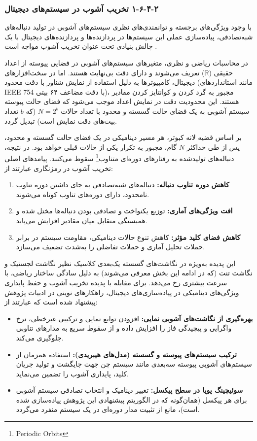 \subsubsection{‏۲‏-‏۴‏-‏۶‏-‏۱‏ تخریب آشوب در سیستم‌های دیجیتال}

با وجود ویژگی‌های برجسته و توانمندی‌های نظری سیستم‌های آشوبی در تولید دنباله‌های شبه‌تصادفی، پیاده‌سازی عملی این سیستم‌ها در پردازنده‌ها و پردازنده‌های دیجیتال با یک چالش بنیادی تحت عنوان تخریب آشوب مواجه است \cite{ref5, ref19}. 

در محاسبات ریاضی و نظری، متغیرهای سیستم‌های آشوبی در فضایی پیوسته از اعداد حقیقی ($\mathbb{R}$) تعریف می‌شوند و دارای دقت بی‌نهایت هستند. اما در سخت‌افزارهای دیجیتال، کامپیوترها به دلیل استفاده از نمایش شناور با دقت محدود (مانند استانداردهای IEEE 754 با دقت مضاعف ۶۴ بیتی)، مجبور به گرد کردن و کوانتایز کردن مقادیر هستند. این محدودیت دقت در نمایش اعداد موجب می‌شود که فضای حالت پیوسته سیستم آشوبی به یک فضای حالت گسسته و محدود با تعداد حالات $N=2^b$ (که $b$ تعداد بیت‌های دقت نمایش است) تبدیل گردد.

بر اساس قضیه لانه کبوتر، هر مسیر دینامیکی در یک فضای حالت گسسته و محدود، پس از طی حداکثر $N$ گام، مجبور به تکرار یکی از حالات قبلی خواهد بود. در نتیجه، دنباله‌های تولیدشده به رفتارهای دوره‌ای متناوب\footnote{Periodic Orbits} سقوط می‌کنند. پیامدهای اصلی تخریب آشوب در رمزنگاری عبارتند از:
\begin{enumerate}
    \item \textbf{کاهش دوره تناوب دنباله:} دنباله‌های شبه‌تصادفی به جای داشتن دوره تناوب نامحدود، دارای دوره‌های تناوب کوتاه می‌شوند.
    \item \textbf{افت ویژگی‌های آماری:} توزیع یکنواخت و تصادفی بودن دنباله‌ها مختل شده و همبستگی متقابل میان مقادیر افزایش می‌یابد.
    \item \textbf{کاهش فضای کلید مؤثر:} کاهش تنوع حالات دینامیکی، مقاومت سیستم در برابر حملات تحلیل آماری و حملات تفاضلی را به‌شدت تضعیف می‌سازد.
\end{enumerate}

این پدیده به‌ویژه در نگاشت‌های گسسته یک‌بعدی کلاسیک نظیر نگاشت لجستیک و نگاشت تنت (که در ادامه این بخش معرفی می‌شوند) به دلیل سادگی ساختار ریاضی، با سرعت بیشتری رخ می‌دهد. برای مقابله با پدیده تخریب آشوب و حفظ پایداری ویژگی‌های دینامیکی در پیاده‌سازی‌های دیجیتال، راهکارهای نوینی در ادبیات پژوهش پیشنهاد شده است که عبارتند از:
\begin{itemize}
    \item \textbf{بهره‌گیری از نگاشت‌های آشوبی نمایی:} افزودن توابع نمایی و ترکیبی غیرخطی، نرخ واگرایی و پیچیدگی فاز را افزایش داده و از سقوط سریع به مدارهای تناوبی جلوگیری می‌کند.
    \item \textbf{ترکیب سیستم‌های پیوسته و گسسته (مدل‌های هیبریدی):} استفاده همزمان از سیستم‌های آشوبی پیوسته سه‌بعدی مانند سیستم چن جهت جایگشت و تولید جریان کلید، پایداری آشوب را تضمین می‌نماید.
    \item \textbf{سوئیچینگ پویا در سطح پیکسل:} تغییر دینامیک و انتخاب تصادفی سیستم آشوبی برای هر پیکسل (همان‌گونه که در الگوریتم پیشنهادی این پژوهش پیاده‌سازی شده است)، مانع از تثبیت مدار دوره‌ای در یک سیستم منفرد می‌گردد.
\end{itemize}

